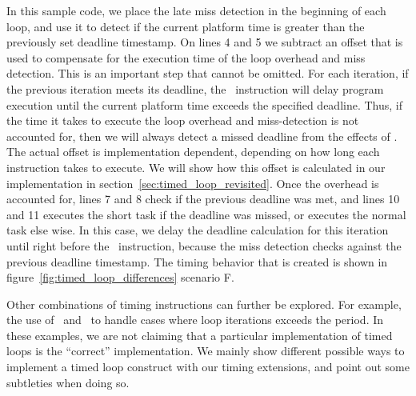 In this sample code, we place the late miss detection in the beginning of each loop, and use it to detect if the current platform time is greater than the previously set deadline timestamp.
On lines 4 and 5 we subtract an offset that is used to compensate for the execution time of the loop overhead and miss detection. 
This is an important step that cannot be omitted.
For each iteration, if the previous iteration meets its deadline, the \delayuntil\ instruction will delay program execution until the current platform time exceeds the specified deadline. 
Thus, if the time it takes to execute the loop overhead and miss-detection is not accounted for, then we will always detect a missed deadline from the effects of \delayuntil.  
The actual offset is implementation dependent, depending on how long each instruction takes to execute.
We will show how this offset is calculated in our implementation in section~\ref{sec:timed_loop_revisited}.
Once the overhead is accounted for, lines 7 and 8 check if the previous deadline was met, and lines 10 and 11 executes the short task if the deadline was missed, or executes the normal task else wise.
In this case, we delay the deadline calculation for this iteration until right before the \delayuntil\ instruction, because the miss detection checks against the previous deadline timestamp.      
The timing behavior that is created is shown in figure~\ref{fig:timed_loop_differences} scenario F. 



Other combinations of timing instructions can further be explored.
For example, the use of \exceptiononexpire\ and \deactivateexception\ to handle cases where loop iterations exceeds the period.
In these examples, we are not claiming that a particular implementation of timed loops is the ``correct'' implementation.
We mainly show different possible ways to implement a timed loop construct with our timing extensions, and point out some subtleties when doing so.



